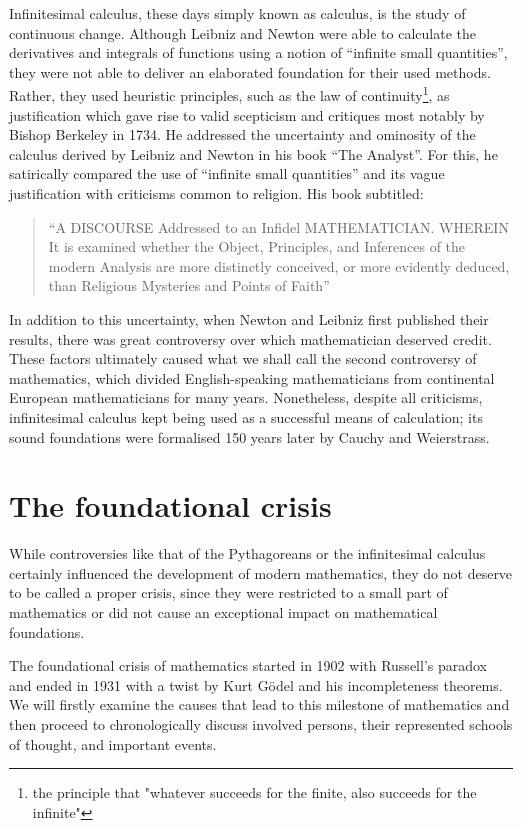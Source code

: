 \documentclass[hidelinks]{article}
\begin{document}
Infinitesimal calculus, these days simply known as calculus, is the study of continuous change. Although Leibniz and Newton were able to calculate the derivatives and integrals of functions using a notion of ``infinite small quantities'', they were not able to deliver an elaborated foundation for their used methods. Rather, they used heuristic principles, such as the law of continuity\footnote{the principle that "whatever succeeds for the finite, also succeeds for the infinite"}, as justification which gave rise to valid scepticism and critiques most notably by Bishop Berkeley in 1734. He addressed the uncertainty and ominosity of the calculus derived by Leibniz and Newton in his book ``The Analyst''. For this, he satirically compared the use of ``infinite small quantities'' and its vague justification with criticisms common to religion. His book subtitled:
\begin{quote}
	``A DISCOURSE Addressed to an Infidel MATHEMATICIAN\@. WHEREIN It is examined whether the Object, Principles, and Inferences of the modern Analysis are more distinctly conceived, or more evidently deduced, than Religious Mysteries and Points of Faith''
\end{quote}
In addition to this uncertainty, when Newton and Leibniz first published their results, there was great controversy over which mathematician deserved credit. These factors ultimately caused what we shall call the second controversy of mathematics, which divided English-speaking mathematicians from continental European mathematicians for many years. None\-theless, despite all criticisms, infinitesimal calculus kept being used as a successful means of calculation; its sound foundations were formalised 150 years later by Cauchy and Weierstrass.

\section{The foundational crisis}
While controversies like that of the Pythagoreans or the infinitesimal calculus certainly influenced the development of modern mathematics, they do not deserve to be called a proper crisis, since they were restricted to a small part of mathematics or did not cause an exceptional impact on mathematical foundations.

The foundational crisis of mathematics started in 1902 with Russell's paradox and ended in 1931 with a twist by Kurt Gödel and his incompleteness theorems.
We will firstly examine the causes that lead to this milestone of mathematics and then proceed to chronologically discuss involved persons, their represented schools of thought, and important events.
\end{document}
